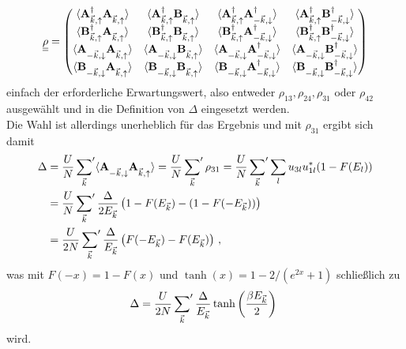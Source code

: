 \begin{align}
    \dul{\rho} = \begin{pmatrix}
        \expval{\oadup \oaup} & \expval{\oadup \obup} & \expval{\oadup \oaddown} & \expval{\oadup \obddown} \\
        \expval{\obdup \oaup} & \expval{\obdup \obup} & \expval{\obdup \oaddown} & \expval{\obdup \obddown} \\
        \expval{\oadown \oaup} & \expval{\oadown \obup} & \expval{\oadown \oaddown} & \expval{\oadown \obddown} \\
        \expval{\obdown \oaup} & \expval{\obdown \obup} & \expval{\obdown \oaddown} & \expval{\obdown \obddown} \\
    \end{pmatrix}
\end{align}
einfach der erforderliche Erwartungswert, also entweder $\rho_{13}, \rho_{24}, \rho_{31}$ oder $\rho_{42}$ ausgewählt und in die Definition von $\Delta$ eingesetzt werden. \\
Die Wahl ist allerdings unerheblich für das Ergebnis und mit $\rho_{31}$ 
ergibt sich damit 
\begin{align}
    \Delta &= \frac{U}{N}\sump{\vk} \expval{\oadown \oaup} = \frac{U}{N}\sump{\vk} \rho_{31} = \frac{U}{N}\sump{\vk} \sum_l u_{3l} u_{1l}^* (1 - F(E_l))\label{eq:Delta_rho} \\
    &= \frac{U}{N}\sump{\vk} \frac{\Delta}{2E_\vk}\left(1 - F(E_\vk) - (1 - F(-E_\vk))\right) \\
    &= \frac{U}{2N}\sump{\vk} \frac{\Delta}{E_\vk}\left(F(-E_\vk) - F(E_\vk)\right) \, ,
\end{align}
was mit $F(-x) = 1 - F(x)$ und $\tanh(x) = 1 - 2/(e^{2x} + 1)$  schließlich zu
\begin{align}
    \Delta = \frac{U}{2N} \sideset{}{'}\sum_{{\vec{k}}} \frac{\Delta}{E_{\vec{k}}} \tanh\left(\frac{\beta E_{\vec{k}}}{2}\right)~\label{eq:gap_eq_half_filling}
\end{align}
wird.

